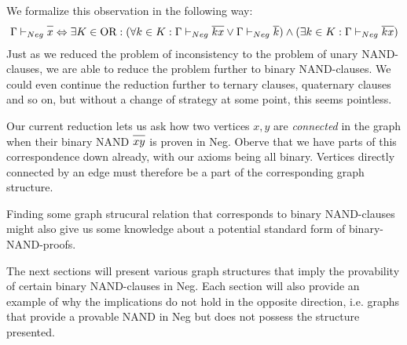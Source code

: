We formalize this observation in the following way:
\begin{align}
  \Gamma \vdash_{Neg} \ol{x} \Leftrightarrow \exists K \in \text{OR}: (\forall k \in K: \Gamma \vdash_{Neg} \ol{kx} \vee \Gamma \vdash_{Neg} \ol{k}) \wedge (\exists k \in K: \Gamma \vdash_{Neg} \ol{kx})
\end{align}
Just as we reduced the problem of inconsistency to the problem of unary NAND-clauses, we are able to reduce the problem further to binary NAND-clauses.
We could even continue the reduction further to ternary clauses, quaternary clauses and so on, but without a change of strategy at some point, this seems pointless.

Our current reduction lets us ask how two vertices $x,y$ are \textit{connected} in the graph when their binary NAND $\ol{xy}$ is proven in Neg.
Oberve that we have parts of this correspondence down already, with our axioms being all binary.
Vertices directly connected by an edge must therefore be a part of the corresponding graph structure.

Finding some graph strucural relation that corresponds to binary NAND-clauses might also give us some knowledge about a potential standard form of binary-NAND-proofs.

The next sections will present various graph structures that imply the provability of certain binary NAND-clauses in Neg.
Each section will also provide an example of why the implications do not hold in the opposite direction, i.e. graphs that provide a provable NAND in Neg but does not possess the structure presented.
